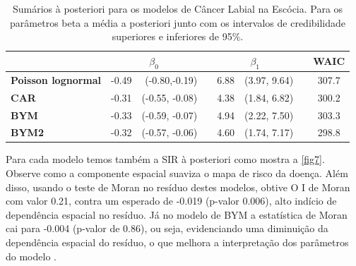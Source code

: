 \begin{table}

\centering
\begin{tabular}{@{}lrrcrrcc@{}}\toprule
& \multicolumn{2}{c}{$\beta_0$} & \phantom{ab}& \multicolumn{2}{c}{$\beta_1$}&\phantom{ab}& WAIC\\

\midrule
\textbf{Poisson lognormal} & -0.49 & (-0.80,-0.19) && 6.88 & (3.97, 9.64) && 307.7\\  %
\textbf{CAR} & -0.31 & (-0.55, -0.08) && 4.38 & (1.84, 6.82) && 300.2\\ 
\textbf{BYM} & -0.33 & (-0.59, -0.07) && 4.94 & (2.22, 7.50) && 303.3\\ 
\textbf{BYM2} & -0.32 & (-0.57, -0.06) && 4.60 & (1.74, 7.17) && 298.8\\
\bottomrule
\end{tabular}
    \caption{Sumários à posteriori para os modelos de Câncer Labial na Escócia. Para os parâmetros beta a média a posteriori junto com os intervalos de credibilidade superiores e inferiores de 95\%.}
    \label{tab:posterior_summary_scotland}
\end{table}

Para cada modelo temos também a SIR à posteriori como mostra a \autoref{fig7}. Observe como a componente espacial suaviza o mapa de risco da doença. Além disso, usando o teste de Moran no resíduo destes modelos, obtive O I de Moran com valor 0.21, contra um esperado de -0.019 (p-valor 0.006), alto indício de dependência espacial no resíduo. Já no modelo de BYM a estatística de Moran cai para -0.004 (p-valor de 0.86), ou seja, evidenciando uma diminuição da dependência espacial do resíduo, o que melhora a interpretação dos parâmetros do modelo \cite{Wakefield2007}.

